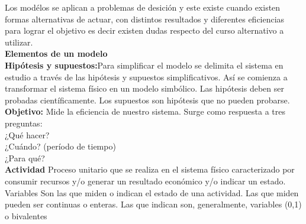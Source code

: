 \documentclass[a4paper,12pt]{article}
\begin{document}
Los mod\'elos se aplican a problemas de desici\'on y este existe cuando existen formas alternativas de actuar, con distintos resultados y diferentes eficiencias para lograr el objetivo es decir existen dudas respecto del curso alternativo a utilizar.
\\
\textbf{Elementos de un modelo}
\\
\textbf{Hipótesis y supuestos:}Para simplificar el modelo se delimita el sistema en estudio a través de las hipótesis y
supuestos simplificativos. Así se comienza a transformar el sistema físico en un modelo simbólico.
Las hipótesis deben ser probadas científicamente. Los supuestos son hipótesis que no pueden probarse.
\\
\textbf{Objetivo: }Mide la eficiencia de nuestro sistema. Surge como respuesta a tres preguntas:
\\
¿Qué hacer?
\\
¿Cuándo? (período de tiempo)
\\
¿Para qué?
\\
\textbf{Actividad}
Proceso unitario que se realiza en el sistema físico caracterizado por consumir recursos
y/o generar un resultado económico y/o indicar un estado.
Variables
Son las que miden o indican el estado de una actividad.
Las que miden pueden ser continuas o enteras.
Las que indican son, generalmente, variables (0,1) o bivalentes
\end{document}
